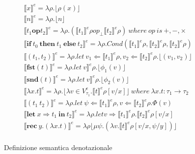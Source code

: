 \documentclass{article}
\newcommand{\rec}[2]{\mathbf{rec}\ #1 . ( #2 )}
\newcommand{\letin}[2]{\mathbf{let}\ #1\ \mathbf{in}\ #2}
\newcommand{\ite}[3]{\mathbf{if}\ #1\ \mathbf{then}\ #2\ \mathbf{else}\ #3}
\newcommand{\fst}[1]{\mathbf{fst} (#1)}
\newcommand{\snd}[1]{\mathbf{snd} (#1)}
\newcommand{\lamb}[2]{\lambda #1 . #2}
\begin{document}
\begin{figure}[!t]
    \centering
    \begin{gather*}
        \llbracket x \rrbracket^{e} =  \lambda\rho.\lfloor\rho (x) \rfloor 
        \\ \llbracket n \rrbracket^{e} =  \lambda\rho.\lfloor n \rfloor
        \\ \llbracket t_{1} \mathbf{op} t_{2} \rrbracket^{e} 
            =  \lambda\rho.(\llbracket t_{1} \rrbracket^{e}\rho
            op_{\perp} \llbracket t_{2} \rrbracket^{e}\rho) \ where\ op\ is\ +,-,\times
        \\ \llbracket \ite{t_{0}}{t_{1}}{t_{2}} \rrbracket^{e} = 
            \lambda\rho.Cond(\llbracket t_{1} \rrbracket^{e}\rho, 
                                \llbracket t_{2} \rrbracket^{e}\rho,
                                \llbracket t_{2} \rrbracket^{e}\rho)
        \\ \llbracket (t_{1},t_{2})\rrbracket^{e} =  
            \lambda\rho. let\ v_{1} \Leftarrow \llbracket t_{1} \rrbracket^{e}\rho,
                v_{2} \Leftarrow \llbracket t_{2} \rrbracket^{e}\rho.
                \lfloor (v_{1}, v_{2})\rfloor
        \\ \llbracket \fst{t} \rrbracket^{e} =  \lambda\rho. let\ v \rrbracket^{e}\rho.\lfloor\phi_{1}(v)\rfloor
        \\ \llbracket \snd{t} \rrbracket^{e} =  \lambda\rho. let\ v \rrbracket^{e}\rho.\lfloor\phi_{2}(v)\rfloor
        \\ \llbracket \lamb{x}{t} \rrbracket^{e} =  \lambda\rho.\lfloor\lambda v \in V^{e}_{\tau_{1}}.\llbracket t \rrbracket^{e}\rho [ v / x ] \rfloor \ where\ \lambda x.t : \tau_{1} \rightarrow \tau_{2}
        \\ \llbracket ( t_{1}\ t_{2} ) \rrbracket^{e} = 
            \lambda\rho. let\ \psi \Leftarrow \llbracket t_{1} \rrbracket^{e}\rho,
                v \Leftarrow \llbracket t_{2} \rrbracket^{e}\rho. \Phi(v)
    \\ \llbracket \letin{x \Rightarrow t_{1}}{t_{2}}\rrbracket^{e} =
        \lambda \rho . let v \Rightarrow \llbracket t_{1} \rrbracket^{e}\rho .
        \llbracket t_{2} \rrbracket^{e}\rho[v/x]
    \\ \llbracket \rec{y}{\lambda x.t} \rrbracket^{e} =
        \lambda\rho\lfloor \mu \psi . (\lambda v.\llbracket t \rrbracket^{e} \rho[v/x,\psi/y]) \rfloor
    \\
    \end{gather*}
    \caption{Definizione semantica denotazionale}
    \label{fig:sem-den}
\end{figure}
\end{document}

